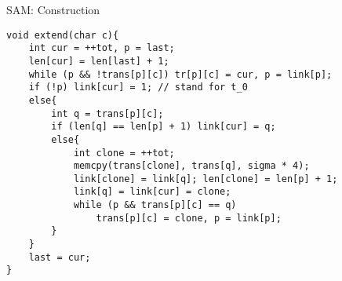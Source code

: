\documentclass{beamer}
\theoremstyle{compact}
\begin{document}
\begin{frame}[fragile]{SAM: Construction}
	\begin{verbatim}
void extend(char c){
    int cur = ++tot, p = last;
    len[cur] = len[last] + 1;
    while (p && !trans[p][c]) tr[p][c] = cur, p = link[p];
    if (!p) link[cur] = 1; // stand for t_0
    else{
        int q = trans[p][c];
        if (len[q] == len[p] + 1) link[cur] = q;
        else{
            int clone = ++tot;
            memcpy(trans[clone], trans[q], sigma * 4);
            link[clone] = link[q]; len[clone] = len[p] + 1;
            link[q] = link[cur] = clone;
            while (p && trans[p][c] == q)
                trans[p][c] = clone, p = link[p];
        }
    }
    last = cur;
}
	\end{verbatim}
		
	\end{frame}
	
\end{document}

